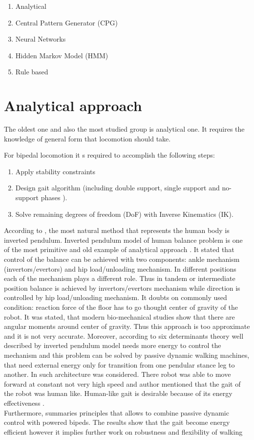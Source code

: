 \documentclass[12pt,a4paper]{report}
\begin{document}
		\begin{enumerate}
			\item Analytical
			\item Central Pattern Generator (CPG)
			\item Neural Networks
			\item Hidden Markov Model (HMM)
			\item Rule based
		\end{enumerate}

		\section{Analytical approach}
		The oldest one and also the most studied group is analytical one. It requires the knowledge of general form that locomotion should take.

		For bipedal locomotion it s required to accomplish the following steps:
		\begin{enumerate}
			\item Apply stability constraints
			\item Design gait algorithm (including double support, single support and no-support phases \cite{wright2014intelligent}).
			\item Solve remaining degrees of freedom (DoF) with Inverse Kinematics (IK).
		\end{enumerate}

		According to \cite{tang2008analysis}, the most natural method that represents the human body is inverted pendulum.
		Inverted pendulum model of human balance problem is one of the most primitive and old example of analytical approach \cite{winter1995human}. It stated that control of the balance can be achieved with two components: ankle mechanism (invertors/evertors) and hip load/unloading mechanism. In different positions each of the mechanism plays a different role. Thus in tandem or intermediate position balance is achieved by invertors/evertors mechanism while direction is controlled by hip load/unloading mechanism. It doubts on commonly used condition: reaction force of the floor has to go thought center of gravity of the robot. It was stated, that modern bio-mechanical studies show that there are angular moments around center of gravity. 
		Thus this approach is too approximate and it is not very accurate.
		Moreover, according to \cite{kuo2007six} six determinants theory\cite{inman1953major} well described by inverted pendulum model needs more energy to control the mechanism and this problem can be solved by passive dynamic walking machines, that need external energy only for transition from one pendular stance leg to another. In \cite{collins2005bipedal} such architecture was considered. There robot was able to move forward at constant not very high speed and author mentioned that the gait of the robot was human like. Human-like gait is desirable because of its energy effectiveness \cite{golliday1977approach}.\\
		Furthermore, \cite{anderson2005powered} summaries principles that allows to combine passive dynamic control with powered bipeds. The results show that the gait become energy efficient however it implies further work on robustness and flexibility of walking\\
\end{document}
